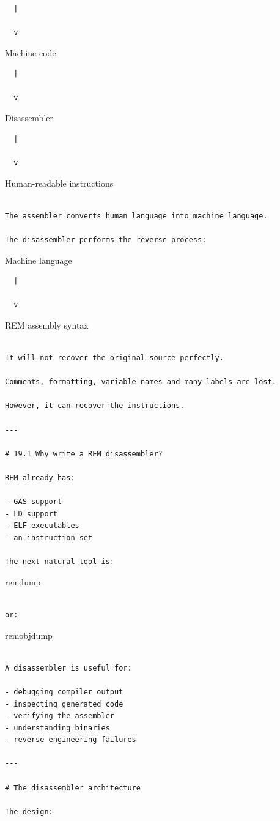 \documentclass[
  oneside,
  openany]{book}
\begin{document}
\begin{verbatim}
  |

  v
\end{verbatim}

Machine code

\begin{verbatim}
  |

  v
\end{verbatim}

Disassembler

\begin{verbatim}
  |

  v
\end{verbatim}

Human-readable instructions

\begin{verbatim}

The assembler converts human language into machine language.

The disassembler performs the reverse process:
\end{verbatim}

Machine language

\begin{verbatim}
  |

  v
\end{verbatim}

REM assembly syntax

\begin{verbatim}

It will not recover the original source perfectly.

Comments, formatting, variable names and many labels are lost.

However, it can recover the instructions.

---

# 19.1 Why write a REM disassembler?

REM already has:

- GAS support
- LD support
- ELF executables
- an instruction set

The next natural tool is:
\end{verbatim}

remdump

\begin{verbatim}

or:
\end{verbatim}

remobjdump

\begin{verbatim}

A disassembler is useful for:

- debugging compiler output
- inspecting generated code
- verifying the assembler
- understanding binaries
- reverse engineering failures

---

# The disassembler architecture

The design:
\end{verbatim}
\end{document}
